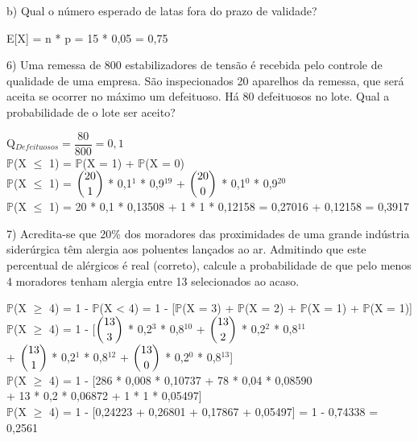 \documentclass[12pt,a4paper]{article}
\begin{document}
	\vspace{1cm}
	b) Qual o número esperado de latas fora do prazo de validade?
	\begin{center}
		\vspace{0.5cm}
		E[X] = n * p = 15 * 0,05 = 0,75
	\end{center}
	\vspace{1cm}
	6) Uma remessa de 800 estabilizadores de tensão é recebida pelo controle de qualidade de uma empresa. São inspecionados 20 aparelhos da remessa, que será aceita se ocorrer no máximo um defeituoso. Há 80 defeituosos no lote. Qual a probabilidade de o lote ser	aceito?
	\begin{center}
		\vspace{0.5cm}
		Q$_{Defeituosos} = \dfrac{80}{800} = 0,1$
		\vspace{0.75cm}\\
		$\mathbb{P}$(X $\leq$ 1) = $\mathbb{P}$(X = 1) + $\mathbb{P}$(X = 0)
		\vspace{0.25cm}\\
		$\mathbb{P}$(X $\leq$ 1) = $\dbinom{20}{1}$ * 0,1$^1$ * 0,9$^{19}$ + $\dbinom{20}{0}$ * 0,1$^0$ * 0,9$^{20}$ 
		\vspace{0.25cm}\\
		$\mathbb{P}$(X $\leq$ 1) = 20 * 0,1 * 0,13508 + 1 * 1 * 0,12158 = 0,27016 + 0,12158 = 0,3917
	\end{center}
	\vspace{1cm}
	7) Acredita-se que 20\% dos moradores das proximidades de uma grande indústria siderúrgica têm alergia aos poluentes lançados ao ar. Admitindo que este percentual de alérgicos é real (correto), calcule a probabilidade de que pelo menos 4 moradores tenham alergia entre 13 selecionados ao acaso.
	\begin{center}
		\vspace{0.5cm}
		$\mathbb{P}$(X $\geq$ 4) = 1 - $\mathbb{P}$(X < 4) = 1 - [$\mathbb{P}$(X = 3) + $\mathbb{P}$(X = 2) + $\mathbb{P}$(X = 1) + $\mathbb{P}$(X = 1)]
		\vspace{0.25cm}\\
		$\mathbb{P}$(X $\geq$ 4) = 1 - [$\dbinom{13}{3}$ * 0,2$^3$ * 0,8$^{10}$ + $\dbinom{13}{2}$ * 0,2$^2$ * 0,8$^{11}$\\ + $\dbinom{13}{1}$ * 0,2$^1$ * 0,8$^{12}$ + $\dbinom{13}{0}$ * 0,2$^0$ * 0,8$^{13}$]
		\vspace{0.25cm}\\
		$\mathbb{P}$(X $\geq$ 4) = 1 - [286 * 0,008 * 0,10737 + 78 * 0,04 * 0,08590\\
		+ 13 * 0,2 * 0,06872 + 1 * 1 * 0,05497]
		\vspace{0.25cm}\\
		$\mathbb{P}$(X $\geq$ 4) = 1 - [0,24223 + 0,26801 + 0,17867 + 0,05497] = 1 - 0,74338 = 0,2561
	\end{center}
\end{document}
